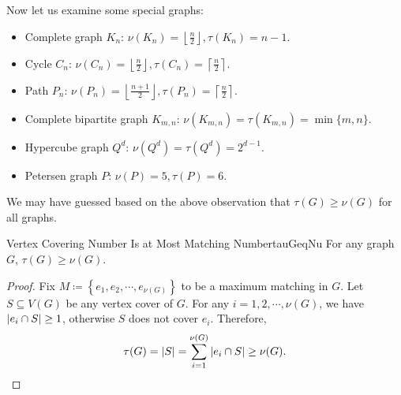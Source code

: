 \documentclass[math, code]{amznotes}
\theoremstyle{remark}
\begin{document}
Now let us examine some special graphs:
\begin{itemize}
    \item Complete graph $K_n$: $\nu(K_n) = \left\lfloor\frac{n}{2}\right\rfloor, \tau(K_n) = n - 1$.
    \item Cycle $C_n$: $\nu(C_n) = \left\lfloor\frac{n}{2}\right\rfloor, \tau(C_n) = \left\lceil\frac{n}{2}\right\rceil$.
    \item Path $P_n$: $\nu(P_n) = \left\lfloor\frac{n + 1}{2}\right\rfloor, \tau(P_n) = \left\lceil\frac{n}{2}\right\rceil$.
    \item Complete bipartite graph $K_{m, n}$: $\nu(K_{m, n}) = \tau(K_{m, n}) = \min\{m, n\}$.
    \item Hypercube graph $Q^d$: $\nu(Q^d) = \tau(Q^d) = 2^{d - 1}$.
    \item Petersen graph $P$: $\nu(P) = 5, \tau(P) = 6$.
\end{itemize}
We may have guessed based on the above observation that $\tau(G) \geq \nu(G)$ for all graphs.
\begin{probox}{Vertex Covering Number Is at Most Matching Number}{tauGeqNu}
    For any graph $G$, $\tau(G) \geq \nu(G)$.
    \tcblower
    \begin{proof}
        Fix $M \coloneqq \left\{e_1, e_2, \cdots, e_{\nu(G)}\right\}$ to be a maximum matching in $G$. Let $S \subseteq V(G)$ be any vertex cover of $G$. For any $i = 1, 2, \cdots, \nu(G)$, we have ${\left\lvert {e_i \cap S} \right\rvert} \geq 1$, otherwise $S$ does not cover $e_i$. Therefore,
        \begin{equation*}
            \tau(G) = {\left\lvert {S} \right\rvert} = \sum_{i = 1}^{\nu(G)}{\left\lvert {e_i \cap S} \right\rvert} \geq \nu(G).
        \end{equation*}
    \end{proof}
\end{probox}
\end{document}
